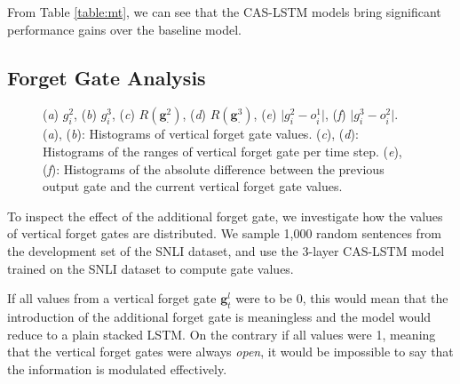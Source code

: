 \documentclass[wcp]{jmlr}
\begin{document}
    From Table \ref{table:mt}, we can see that the CAS-LSTM models bring significant performance gains over the baseline model.
    
    \subsection{Forget Gate Analysis}
    
    \begin{figure}[t]
        \centering
        \quad
        \par\bigskip
        \quad
        \par\bigskip
        \quad
        \caption{
            (\textit{a}) $g^2_i$, (\textit{b}) $g^3_i$, (\textit{c}) $R(\mathbf{g}^2_\cdot)$,
            (\textit{d}) $R(\mathbf{g}^3_\cdot)$, (\textit{e}) $\vert g^2_i - o^1_i \vert$,
            (\textit{f}) $\vert g^3_i - o^2_i \vert$.
            (\textit{a}), (\textit{b}): Histograms of vertical forget gate values.
            (\textit{c}), (\textit{d}): Histograms of the ranges of vertical forget gate per time step.
            (\textit{e}), (\textit{f}): Histograms of the absolute difference between the previous output gate and the current vertical forget gate values.
        }
        \label{fig:gate-analysis}
    \end{figure}
    
    To inspect the effect of the additional forget gate, we investigate how the values of vertical forget gates are distributed.
    We sample 1,000 random sentences from the development set of the SNLI dataset, and use the 3-layer CAS-LSTM model trained on the SNLI dataset to compute gate values.
    
    If all values from a vertical forget gate $\mathbf{g}_t^l$ were to be 0, this would mean that the introduction of the additional forget gate is meaningless and the model would reduce to a plain stacked LSTM.
    On the contrary if all values were 1, meaning that the vertical forget gates were always \textit{open}, it would be impossible to say that the information is modulated effectively.
    
\end{document}
